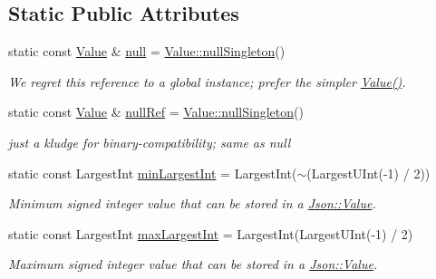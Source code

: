 \subsection*{Static Public Attributes}
\begin{DoxyCompactItemize}
\item 
\mbox{\label{classJson_1_1Value_a21ddb05b92c60c7548e928bf371e7d45}} 
static const \hyperlink{classJson_1_1Value}{Value} \& \hyperlink{classJson_1_1Value_a21ddb05b92c60c7548e928bf371e7d45}{null} = \hyperlink{classJson_1_1Value_af2f124567acc35d021a424e53ebdfcab}{Value\+::null\+Singleton}()
\begin{DoxyCompactList}\small\item\em We regret this reference to a global instance; prefer the simpler \hyperlink{classJson_1_1Value_ada6ba1369448fb0240bccc36efaa46f7}{Value()}. \end{DoxyCompactList}\item 
\mbox{\label{classJson_1_1Value_aaee27e622f87266f861216d644603730}} 
static const \hyperlink{classJson_1_1Value}{Value} \& \hyperlink{classJson_1_1Value_aaee27e622f87266f861216d644603730}{null\+Ref} = \hyperlink{classJson_1_1Value_af2f124567acc35d021a424e53ebdfcab}{Value\+::null\+Singleton}()
\begin{DoxyCompactList}\small\item\em just a kludge for binary-\/compatibility; same as null \end{DoxyCompactList}\item 
\mbox{\label{classJson_1_1Value_af91df130daa50dd43d2cd89e6ee67706}} 
static const Largest\+Int \hyperlink{classJson_1_1Value_af91df130daa50dd43d2cd89e6ee67706}{min\+Largest\+Int} = Largest\+Int($\sim$(Largest\+U\+Int(-\/1) / 2))
\begin{DoxyCompactList}\small\item\em Minimum signed integer value that can be stored in a \hyperlink{classJson_1_1Value}{Json\+::\+Value}. \end{DoxyCompactList}\item 
\mbox{\label{classJson_1_1Value_a8b4977696f13296fa8755c7953fafb2f}} 
static const Largest\+Int \hyperlink{classJson_1_1Value_a8b4977696f13296fa8755c7953fafb2f}{max\+Largest\+Int} = Largest\+Int(Largest\+U\+Int(-\/1) / 2)
\begin{DoxyCompactList}\small\item\em Maximum signed integer value that can be stored in a \hyperlink{classJson_1_1Value}{Json\+::\+Value}. \end{DoxyCompactList}\item 

\end{DoxyCompactItemize}
